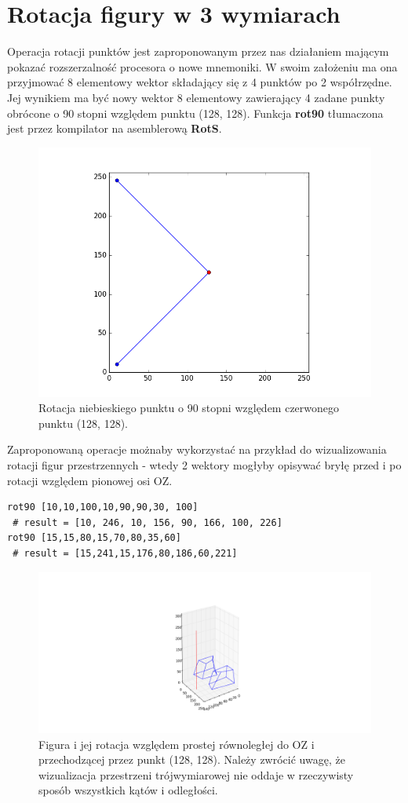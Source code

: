 \section{Rotacja figury w 3 wymiarach}
Operacja rotacji punktów jest zaproponowanym przez nas działaniem mającym pokazać rozszerzalność procesora o nowe mnemoniki. W swoim założeniu ma ona przyjmować 8 elementowy wektor składający się z 4 punktów po 2 współrzędne. Jej wynikiem ma być nowy wektor 8 elementowy zawierający 4 zadane punkty obrócone o 90 stopni względem punktu (128, 128). Funkcja \textbf{rot90} tłumaczona jest przez kompilator na asemblerową \textbf{RotS}.
\begin{figure}[!ht]
\centerline{
\includegraphics[scale=1]{images/figure_1}}
\caption{Rotacja niebieskiego punktu o 90 stopni względem czerwonego punktu (128, 128).}
\end{figure}
\clearpage
Zaproponowaną operacje możnaby wykorzystać na przykład do wizualizowania rotacji figur przestrzennych - wtedy 2 wektory mogłyby opisywać bryłę przed i po rotacji względem pionowej osi OZ.
\begin{lstlisting}[frame=single]
rot90 [10,10,100,10,90,90,30, 100]
 # result = [10, 246, 10, 156, 90, 166, 100, 226] 
rot90 [15,15,80,15,70,80,35,60]
 # result = [15,241,15,176,80,186,60,221] 
\end{lstlisting}
\begin{figure}[!ht]
\centerline{
\includegraphics[scale=0.75]{images/3d_12}}
\caption{Figura i jej rotacja względem prostej równoległej do OZ i przechodzącej przez punkt (128, 128). Należy zwrócić uwagę, że wizualizacja przestrzeni trójwymiarowej nie oddaje w rzeczywisty sposób wszystkich kątów i odległości.}
\end{figure}
